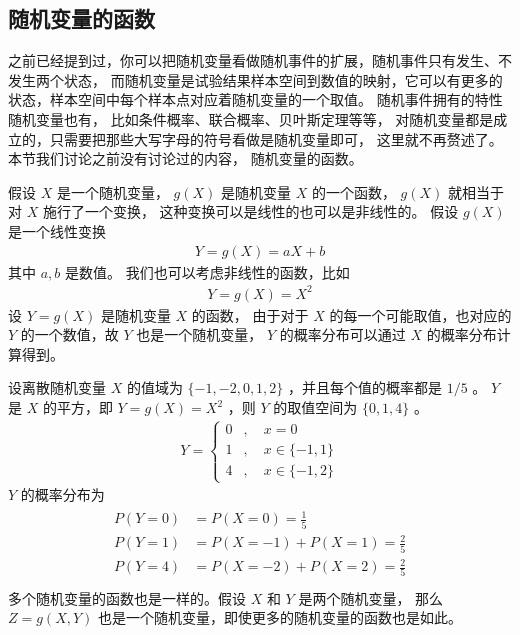 \documentclass[letterpaper,10pt,english]{sphinxmanual}
\begin{document}
\subsection{随机变量的函数}
\label{\detokenize{_u6982_u7387_u57fa_u7840/content:id14}}
之前已经提到过，你可以把随机变量看做随机事件的扩展，随机事件只有发生、不发生两个状态，
而随机变量是试验结果样本空间到数值的映射，它可以有更多的状态，样本空间中每个样本点对应着随机变量的一个取值。
随机事件拥有的特性随机变量也有，
比如条件概率、联合概率、贝叶斯定理等等，
对随机变量都是成立的，只需要把那些大写字母的符号看做是随机变量即可，
这里就不再赘述了。
本节我们讨论之前没有讨论过的内容，
随机变量的函数。

假设 \(X\) 是一个随机变量，
\(g(X)\) 是随机变量 \(X\) 的一个函数，
\(g(X)\) 就相当于对 \(X\) 施行了一个变换，
这种变换可以是线性的也可以是非线性的。
假设 \(g(X)\) 是一个线性变换
\begin{equation}\label{equation:概率基础/content:概率基础/content:36}
\begin{split}Y = g(X) = aX + b\end{split}
\end{equation}
其中 \(a,b\) 是数值。
我们也可以考虑非线性的函数，比如
\begin{equation}\label{equation:概率基础/content:概率基础/content:37}
\begin{split}Y = g(X) = X^2\end{split}
\end{equation}
设 \(Y=g(X)\) 是随机变量 \(X\) 的函数，
由于对于 \(X\) 的每一个可能取值，也对应的 \(Y\)
的一个数值，故 \(Y\) 也是一个随机变量，
\(Y\) 的概率分布可以通过 \(X\) 的概率分布计算得到。

设离散随机变量 \(X\) 的值域为 \(\{-1,-2,0,1,2\}\)
，并且每个值的概率都是 \(1/5\)
。 \(Y\) 是 \(X\) 的平方，即 \(Y=g(X)=X^2\)
，则 \(Y\) 的取值空间为 \(\{0,1,4\}\)
。
\begin{equation}\label{equation:概率基础/content:概率基础/content:38}
\begin{split}Y =\left\{
    \begin{aligned}
    0 &, \quad x =0 \\
    1 &, \quad x \in \{-1,1\} \\
    4 &, \quad x \in \{-1,2\}
    \end{aligned}
    \right.\end{split}
\end{equation}
\(Y\) 的概率分布为
\begin{align}\label{equation:概率基础/content:概率基础/content:39}\!\begin{aligned}
P(Y=0) &= P(X=0) = \frac{1}{5}\\
P(Y=1) &= P(X=-1) + P(X=1) = \frac{2}{5}\\
P(Y=4) &= P(X=-2) + P(X=2) = \frac{2}{5}\\
\end{aligned}\end{align}
多个随机变量的函数也是一样的。假设 \(X\) 和 \(Y\) 是两个随机变量，
那么 \(Z=g(X,Y)\) 也是一个随机变量，即使更多的随机变量的函数也是如此。
\end{document}
